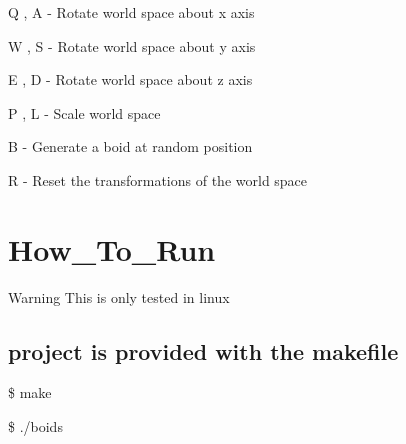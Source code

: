 \begin{DoxyEnumerate}
\item Q , A -\/ Rotate world space about x axis
\item W , S -\/ Rotate world space about y axis
\item E , D -\/ Rotate world space about z axis
\item P , L -\/ Scale world space
\item B -\/ Generate a boid at random position
\item R -\/ Reset the transformations of the world space 
\end{DoxyEnumerate}\hypertarget{index_How_To_Run}{}\section{How\+\_\+\+To\+\_\+\+Run}\label{index_How_To_Run}
\begin{DoxyWarning}{Warning}
This is only tested in linux 
\end{DoxyWarning}
\hypertarget{index_This}{}\subsection{project is provided with the makefile}\label{index_This}

\begin{DoxyEnumerate}
\item \$ make
\item \$ ./boids 
\end{DoxyEnumerate}